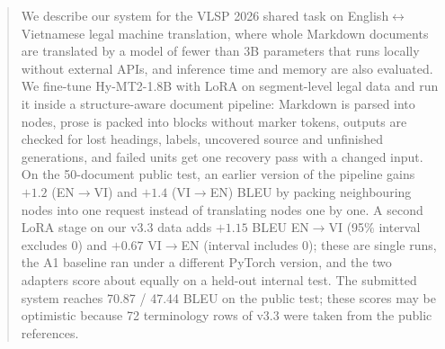 \begin{abstract}
We describe our system for the VLSP 2026 shared task on English$\leftrightarrow$Vietnamese legal machine translation, where whole Markdown documents are translated by a model of fewer than 3B parameters that runs locally without external APIs, and inference time and memory are also evaluated.
We fine-tune Hy-MT2-1.8B with LoRA on segment-level legal data and run it inside a structure-aware document pipeline: Markdown is parsed into nodes, prose is packed into blocks without marker tokens, outputs are checked for lost headings, labels, uncovered source and unfinished generations, and failed units get one recovery pass with a changed input.
On the 50-document public test, an earlier version of the pipeline gains $+1.2$ (EN$\to$VI) and $+1.4$ (VI$\to$EN) BLEU by packing neighbouring nodes into one request instead of translating nodes one by one.
A second LoRA stage on our v3.3 data adds $+1.15$ BLEU EN$\to$VI (95\% interval excludes 0) and $+0.67$ VI$\to$EN (interval includes 0); these are single runs, the A1 baseline ran under a different PyTorch version, and the two adapters score about equally on a held-out internal test.
The submitted system reaches 70.87 / 47.44 BLEU on the public test; these scores may be optimistic because 72 terminology rows of v3.3 were taken from the public references.
\end{abstract}
